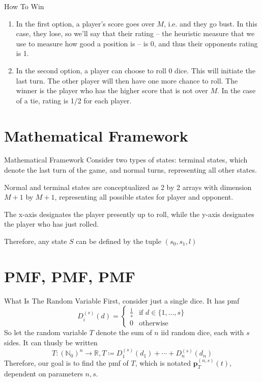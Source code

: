 \documentclass{beamer}
\begin{document}
\begin{frame}{How To Win}
    \begin{enumerate}
        \item In the first option, a player's score goes over $M$, i.e. and they go bust. In this case, they lose, so we'll say that their rating -- the heuristic measure that we use to measure how good a position is -- is 0, and thus their opponents rating is 1. 
        \item In the second option, a player can choose to roll 0 dice. This will initiate the last turn. The other player will then have one more chance to roll. The winner is the player who has the higher score that is not over $M$. In the case of a tie, rating is 1/2 for each player. 
    \end{enumerate}
\end{frame}

\section{Mathematical Framework}
\begin{frame}{Mathematical Framework}
    Consider two types of states: terminal states, which denote the last turn of the game, and normal turns, representing all other states. 

    Normal and terminal states are conceptualized as 2 by 2 arrays with dimension $M+1$ by $M+1$, representing all possible states for player and opponent.
    
    The x-axis designates the player presently up to roll, while the y-axis designates the player who has just rolled.

    Therefore, any state $S$ can be defined by the tuple $(s_0, s_1, l)$
\end{frame}

\section{PMF, PMF, PMF}
\begin{frame}{What Is The Random Variable}
    First, consider just a single dice. It has pmf
    $$
    D_{i}^{(s)}(d) = \begin{cases}
        \frac{1}{s} & \text{if } d \in \{1, \ldots, s \} \\
        0 & \text{otherwise}
    \end{cases}
    $$
    So let the random variable $T$ denote the sum of $n$ iid random dice, each with $s$ sides. It can thusly be written
    $$ 
    T: \left(\mathbb{N}_{0}\right)^n \to \mathbb{R}, T \coloneqq D_{1}^{(s)}(d_1) + \cdots + D_{n}^{(s)}(d_n) 
    $$
    Therefore, our goal is to find the pmf of $T$, which is notated $\textbf{p}_{T}^{(n, s)}(t)$, dependent on parameters $n, s$. 
\end{frame}
\end{document}
